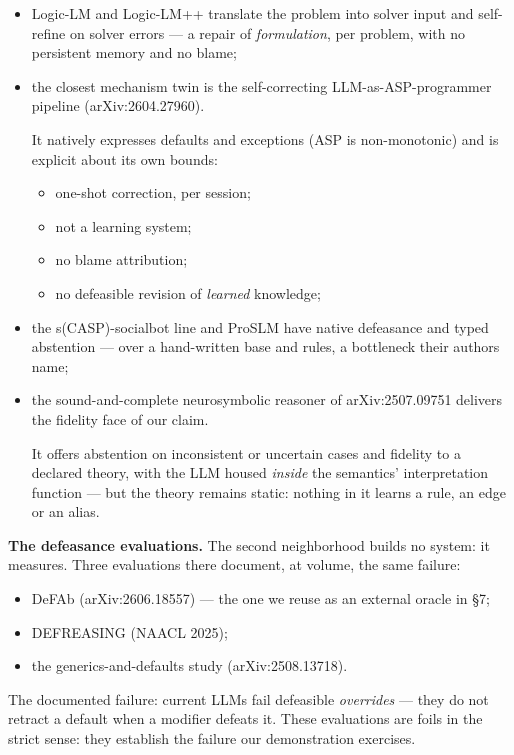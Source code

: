 \documentclass[11pt]{article}
\begin{document}
\begin{itemize}
\item Logic-LM and Logic-LM++ translate the problem into solver input and self-refine on solver errors — a repair of \emph{formulation}, per problem, with no persistent memory and no blame;
\item the closest mechanism twin is the self-correcting LLM-as-ASP-programmer pipeline (arXiv:2604.27960). \par It natively expresses defaults and exceptions (ASP is non-monotonic) and is explicit about its own bounds:

\begin{itemize}
\item one-shot correction, per session;
\item not a learning system;
\item no blame attribution;
\item no defeasible revision of \emph{learned} knowledge;

\end{itemize}
\item the s(CASP)-socialbot line and ProSLM have native defeasance and typed abstention — over a hand-written base and rules, a bottleneck their authors name;
\item the sound-and-complete neurosymbolic reasoner of arXiv:2507.09751 delivers the fidelity face of our claim. \par It offers abstention on inconsistent or uncertain cases and fidelity to a declared theory, with the LLM housed \emph{inside} the semantics' interpretation function — but the theory remains static: nothing in it learns a rule, an edge or an alias.
\end{itemize}

\textbf{The defeasance evaluations.} The second neighborhood builds no system: it measures. Three evaluations there document, at volume, the same failure:

\begin{itemize}
\item DeFAb (arXiv:2606.18557) — the one we reuse as an external oracle in §7;
\item DEFREASING (NAACL 2025);
\item the generics-and-defaults study (arXiv:2508.13718).
\end{itemize}

The documented failure: current LLMs fail defeasible \emph{overrides} — they do not retract a default when a modifier defeats it. These evaluations are foils in the strict sense: they establish the failure our demonstration exercises.
\end{document}
